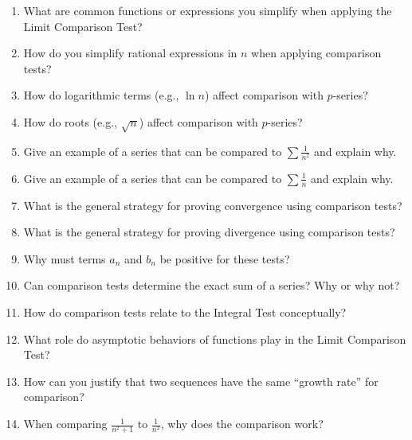 \begin{enumerate}
  \item What are common functions or expressions you simplify when applying the Limit Comparison Test?
  \item How do you simplify rational expressions in $n$ when applying comparison tests?
  \item How do logarithmic terms (e.g., $\ln n$) affect comparison with $p$-series?
  \item How do roots (e.g., $\sqrt{n}$) affect comparison with $p$-series?
  \item Give an example of a series that can be compared to $\sum \frac{1}{n^2}$ and explain why.
  \item Give an example of a series that can be compared to $\sum \frac{1}{n}$ and explain why.
  \item What is the general strategy for proving convergence using comparison tests?
  \item What is the general strategy for proving divergence using comparison tests?
  \item Why must terms $a_n$ and $b_n$ be positive for these tests?
  \item Can comparison tests determine the exact sum of a series? Why or why not?
  \item How do comparison tests relate to the Integral Test conceptually?
  \item What role do asymptotic behaviors of functions play in the Limit Comparison Test?
  \item How can you justify that two sequences have the same “growth rate” for comparison?
  \item When comparing $\frac{1}{n^2+1}$ to $\frac{1}{n^2}$, why does the comparison work?
\end{enumerate}
